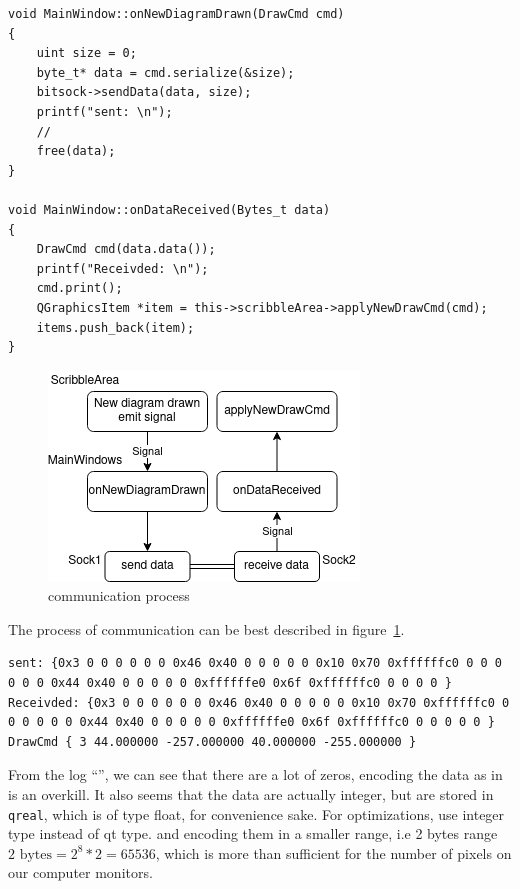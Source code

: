 \documentclass[11pt]{article}
\begin{document}
\begin{multicols*}{2}
\begin{lstlisting}[label=lst:using-serialization, caption={communication code}]
void MainWindow::onNewDiagramDrawn(DrawCmd cmd)
{
    uint size = 0;
    byte_t* data = cmd.serialize(&size);
    bitsock->sendData(data, size);
    printf("sent: \n");
    //
    free(data);
}

void MainWindow::onDataReceived(Bytes_t data)
{
    DrawCmd cmd(data.data());
    printf("Receivded: \n");
    cmd.print();
    QGraphicsItem *item = this->scribbleArea->applyNewDrawCmd(cmd);
    items.push_back(item);
}
\end{lstlisting}

\begin{figure}[H]
  \centering
  \includegraphics[width=\columnwidth]{serialize-flowchart}
  \caption{communication process}
  \label{fig:serialize-flowchart}
\end{figure}
\figsquish

The process of communication can be best described in figure~\ref{fig:serialize-flowchart}.

\begin{lstlisting}[label=lst:serialization-log, caption={serialized data pass through in communication}]
sent: {0x3 0 0 0 0 0 0 0x46 0x40 0 0 0 0 0 0x10 0x70 0xffffffc0 0 0 0 0 0 0 0x44 0x40 0 0 0 0 0 0xffffffe0 0x6f 0xffffffc0 0 0 0 0 }
Receivded: {0x3 0 0 0 0 0 0 0x46 0x40 0 0 0 0 0 0x10 0x70 0xffffffc0 0 0 0 0 0 0 0x44 0x40 0 0 0 0 0 0xffffffe0 0x6f 0xffffffc0 0 0 0 0 0 }
DrawCmd { 3 44.000000 -257.000000 40.000000 -255.000000 }
\end{lstlisting}

From the log ``'', we can see that there are a lot of zeros, encoding the data as in is an overkill. It also seems that the data are actually integer, but are stored in \verb|qreal|, which is of type float, for convenience sake. For optimizations, use integer type instead of qt type. and encoding them in a smaller range, i.e 2 bytes range \( \text{2 bytes} = 2^8*2 = 65536 \), which is more than sufficient for the number of pixels on our computer monitors.


\end{multicols*}
\end{document}
